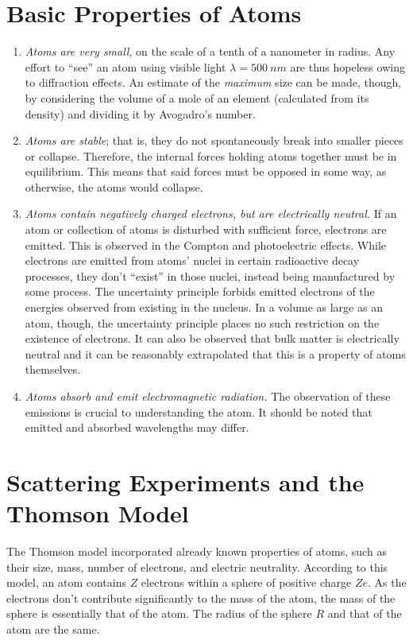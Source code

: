 \documentclass{subfiles}
\begin{document}
	\section{Basic Properties of Atoms}
		\begin{enumerate}
			\item
				\textit{Atoms are very small}, on the scale of a tenth of a nanometer in radius. Any effort to \enquote{see} an atom using visible light \(\lambda = \SI{500}{nm}\) are thus hopeless owing to diffraction effects. An estimate of the \textit{maximum} size can be made, though, by considering the volume of a mole of an element (calculated from its density) and dividing it by Avogadro's number.
			\item
				\textit{Atoms are stable}; that is, they do not spontaneously break into smaller pieces or collapse. Therefore, the internal forces holding atoms together must be in equilibrium. This means that said forces must be opposed in some way, as otherwise, the atoms would collapse.
			\item
				\textit{Atoms contain negatively charged electrons, but are electrically neutral.} If an atom or collection of atoms is disturbed with sufficient force, electrons are emitted. This is observed in the Compton and photoelectric effects. While electrons are emitted from atoms' nuclei in certain radioactive decay processes, they don't \enquote{exist} in those nuclei, instead being manufactured by some process. The uncertainty principle forbids emitted electrons of the energies observed from existing in the nucleus. In a volume as large as an atom, though, the uncertainty principle places no such restriction on the existence of electrons. It can also be observed that bulk matter is electrically neutral and it can be reasonably extrapolated that this is a property of atoms themselves.
			\item
				\textit{Atoms absorb and emit electromagnetic radiation.} The observation of these emissions is crucial to understanding the atom. It should be noted that emitted and absorbed wavelengths may differ.
		\end{enumerate}
	\section{Scattering Experiments and the Thomson Model}
		The Thomson model incorporated already known properties of atoms, such as their size, mass, number of electrons, and electric neutrality. According to this model, an atom contains \(Z\) electrons within a sphere of positive charge \(Ze\). As the electrons don't contribute significantly to the mass of the atom, the mass of the sphere is essentially that of the atom. The radius of the sphere \(R\) and that of the atom are the same.
\end{document}
